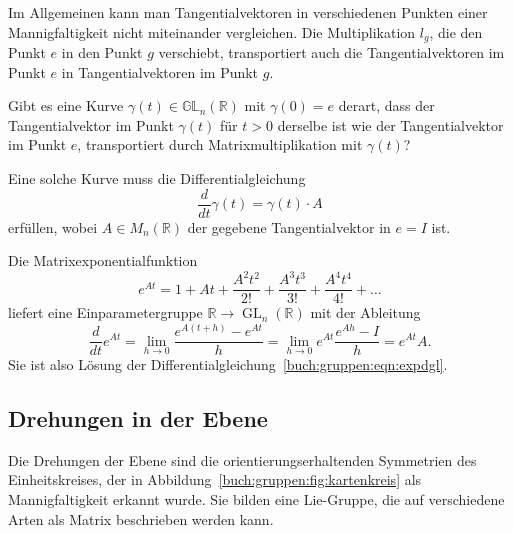 Im Allgemeinen kann man Tangentialvektoren in verschiedenen Punkten
einer Mannigfaltigkeit nicht miteinander vergleichen.
Die Multiplikation $l_g$, die den Punkt $e$ in den Punkt $g$ verschiebt,
transportiert auch die Tangentialvektoren im Punkt $e$ in 
Tangentialvektoren im Punkt $g$.

\begin{aufgabe}
Gibt es eine Kurve $\gamma(t)\in\mathbb{GL}_n(\mathbb{R})$ mit
$\gamma(0)=e$ derart, dass der Tangentialvektor im Punkt $\gamma(t)$
für $t>0$ derselbe ist wie der Tangentialvektor im Punkt $e$, transportiert
durch Matrixmultiplikation mit $\gamma(t)$?
\end{aufgabe}

Eine solche Kurve muss die Differentialgleichung
\begin{equation}
\frac{d}{dt}\gamma(t)
=
\gamma(t)\cdot A
\label{buch:gruppen:eqn:expdgl}
\end{equation}
erfüllen, wobei $A\in M_n(\mathbb{R})$ der gegebene Tangentialvektor
in $e=I$ ist.

Die Matrixexponentialfunktion
\[
e^{At}
=
1+At+\frac{A^2t^2}{2!}+\frac{A^3t^3}{3!}+\frac{A^4t^4}{4!}+\dots
\]
liefert eine Einparametergruppe
$\mathbb{R}\to \operatorname{GL}_n(\mathbb{R})$ mit der Ableitung
\[
\frac{d}{dt} e^{At}
=
\lim_{h\to 0} \frac{e^{A(t+h)}-e^{At}}{h}
=
\lim_{h\to 0} e^{At}\frac{e^{Ah}-I}{h}
=
e^{At} A.
\]
Sie ist also Lösung der Differentialgleichung~\eqref{buch:gruppen:eqn:expdgl}.

\subsection{Drehungen in der Ebene
\label{buch:gruppen:drehungen2d}}
Die Drehungen der Ebene sind die orientierungserhaltenden Symmetrien
des Einheitskreises, der in Abbildung~\ref{buch:gruppen:fig:kartenkreis}
als Mannigfaltigkeit erkannt wurde.
Sie bilden eine Lie-Gruppe, die auf verschiedene Arten als Matrix
beschrieben werden kann.

